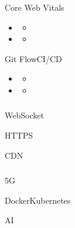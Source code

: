 
Core Web Vitals

\begin{itemize}
\item
  \begin{itemize}
  \tightlist
  \item
  \end{itemize}
\item
  \begin{itemize}
  \tightlist
  \item
  \end{itemize}
\end{itemize}


Git FlowCI/CD

\begin{itemize}
\item
  \begin{itemize}
  \tightlist
  \item
  \end{itemize}
\item
  \begin{itemize}
  \tightlist
  \item
  \end{itemize}
\end{itemize}

\hypertarget{section-88}{%
\subsubsection{}\label{section-88}}

\important{}

\important{}WebSocket

\important{}HTTPS

\important{}CDN

\hypertarget{section-89}{%
\subsubsection{}\label{section-89}}

\important{}5G

\important{}DockerKubernetes


\important{}AI

\hypertarget{section-90}{%
\subsubsection{}\label{section-90}}

